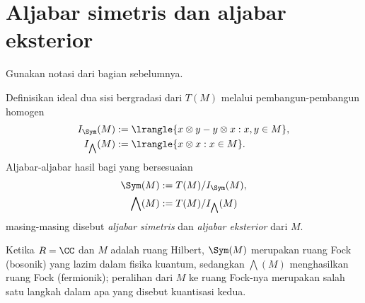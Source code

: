 \section{Aljabar simetris dan aljabar eksterior}
Gunakan notasi dari bagian sebelumnya.
\begin{definition}\label{def:Sym-wedge}    
	Definisikan ideal dua sisi bergradasi dari $T(M)$ melalui pembangun-pembangun homogen
	\begin{align*}
		I_{\Sym}(M) & := \lrangle{ x \otimes y - y \otimes x : x,y \in M}, \\
		I_{\bigwedge}(M) & := \lrangle{x \otimes x : x \in M}.
	\end{align*}
	Aljabar-aljabar hasil bagi yang bersesuaian
	\begin{align*}
		\Sym(M) & := T(M)/I_{\Sym}(M), \\
		\bigwedge(M) & := T(M)/I_{\bigwedge}(M)
	\end{align*}
	masing-masing disebut \emph{aljabar simetris} dan \emph{aljabar eksterior} dari $M$.
\end{definition}

Ketika $R = \CC$ dan $M$ adalah ruang Hilbert, $\Sym(M)$ merupakan ruang Fock (bosonik) yang lazim dalam fisika kuantum, sedangkan $\bigwedge(M)$ menghasilkan ruang Fock (fermionik); peralihan dari $M$ ke ruang Fock-nya merupakan salah satu langkah dalam apa yang disebut kuantisasi kedua.

